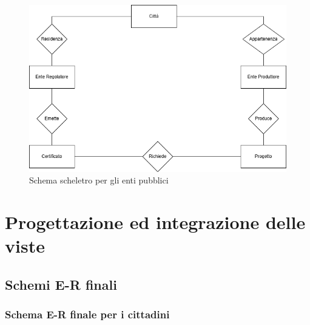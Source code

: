 \documentclass{article}
\begin{document}
\begin{figure}[H]
    \centering
    \includegraphics[width=15cm]{images/SchemaScheletroEnte.drawio}
    \caption{Schema scheletro per gli enti pubblici}
    \label{fig:schema-sostenibilita}
\end{figure}

\newpage
\section{Progettazione ed integrazione delle viste}

\subsection{Schemi E-R finali}
 \subsubsection{Schema E-R finale per i cittadini}
\end{document}

